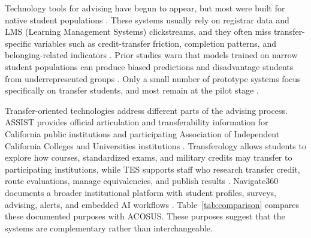 \documentclass[letterpaper,11pt]{article}
\begin{document}
Technology tools for advising have begun to appear, but most were built for native student populations \parencite{nguyen2024community}. These systems usually rely on registrar data and LMS (Learning Management Systems) clickstreams, and they often miss transfer-specific variables such as credit-transfer friction, completion patterns, and belonging-related indicators \parencite{nguyen2024community,nguyen2025school}. Prior studies warn that models trained on narrow student populations can produce biased predictions and disadvantage students from underrepresented groups \parencite{socialcognitive2022,computingtransfer2024}. Only a small number of prototype systems focus specifically on transfer students, and most remain at the pilot stage \parencite{topicmodeling2024}.

Transfer-oriented technologies address different parts of the advising process. ASSIST provides official articulation and transferability information for California public institutions and participating Association of Independent California Colleges and Universities institutions \parencite{assistResource2026}. Transferology allows students to explore how courses, standardized exams, and military credits may transfer to participating institutions, while TES supports staff who research transfer credit, route evaluations, manage equivalencies, and publish results \parencite{transferologySupport2026,collegeSourceTES2026}. Navigate360 documents a broader institutional platform with student profiles, surveys, advising, alerts, and embedded AI workflows \parencite{navigate3602026}. Table~\ref{tab:comparison} compares these documented purposes with ACOSUS. These purposes suggest that the systems are complementary rather than interchangeable.
\end{document}
